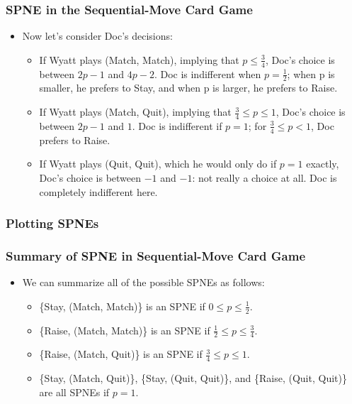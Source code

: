 \begin{frame}
\frametitle{SPNE in the Sequential-Move Card Game}
\begin{itemize}
	\item Now let's consider Doc's decisions:
	\begin{itemize}
		\item If Wyatt plays (Match, Match), implying that $p \leq \frac{3}{4}$, Doc's choice is between $2p-1$ and $4p-2$. Doc is indifferent when $p = \frac{1}{2}$; when p is smaller, he prefers to Stay, and when p is larger, he prefers to Raise.
		\item If Wyatt plays (Match, Quit), implying that $\frac{3}{4} \leq p \leq 1$, Doc's choice is between $2p - 1$ and $1$. Doc is indifferent if $p = 1$; for $\frac{3}{4} \leq p < 1$, Doc prefers to Raise.
		\item If Wyatt plays (Quit, Quit), which he would only do if $p = 1$ exactly, Doc's choice is between $-1$ and $-1$: not really a choice at all. Doc is completely indifferent here.
	\end{itemize}
\end{itemize}
\end{frame}

\begin{frame}
\frametitle{Plotting SPNEs}
\end{frame}

\begin{frame}
\frametitle{Summary of SPNE in Sequential-Move Card Game}
\begin{itemize}
\item We can summarize all of the possible SPNEs as follows:
\begin{itemize}
\item \{Stay, (Match, Match)\} is an SPNE if $0 \leq p \leq \frac{1}{2}$.
\item \{Raise, (Match, Match)\} is an SPNE if $\frac{1}{2} \leq p \leq \frac{3}{4}$.
\item \{Raise, (Match, Quit)\} is an SPNE if $\frac{3}{4} \leq p \leq 1$.
\item \{Stay, (Match, Quit)\}, \{Stay, (Quit, Quit)\}, and \{Raise, (Quit, Quit)\} are all SPNEs if $p = 1$.
\end{itemize}
\end{itemize}
\end{frame}

